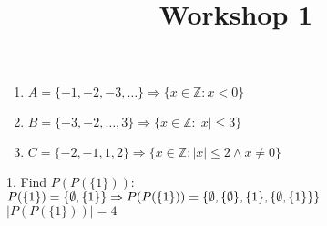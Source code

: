 \documentclass[danish,english,10pt,a4paper]{article}
\title{Workshop 1}
\begin{document}
\maketitle

\begin{enumerate}
\item $A = \{ -1, -2, -3, \dots\} \Rightarrow \{x \in \mathbb{Z} : x < 0\}$

\item $B = \{ -3, -2, \dots, 3\} \Rightarrow \{x \in \mathbb{Z} : |x| \leq 3 \}$

\item $C = \{ -2, -1, 1, 2\} \Rightarrow \{x \in \mathbb{Z} : |x| \leq 2 \wedge x \neq 0 \}$
\end{enumerate}

1. Find $P(P(\{1\}))$:
\\
$P(\{1\}) = \{\emptyset, \{1\}\} \Rightarrow  \\
P(P(\{1\})) = \{\emptyset, \{\emptyset\}, \{1\}, \{\emptyset, \{1\}\}\}$
\\
$| P(P(\{1\})) |= 4$
\end{document}
